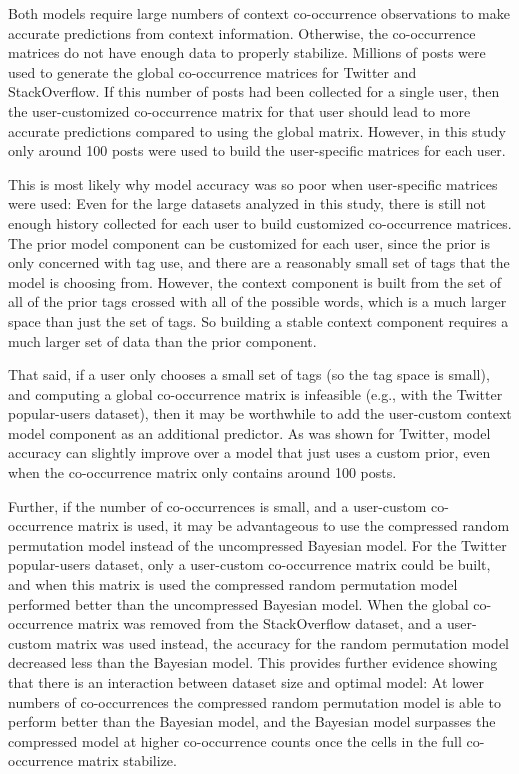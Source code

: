 \documentclass[man,floatsintext,donotrepeattitle]{apa6}
\begin{document}
Both models require large numbers of context co-occurrence observations to make accurate predictions from context information.
Otherwise, the co-occurrence matrices do not have enough data to properly stabilize.
Millions of posts were used to generate the global co-occurrence matrices for Twitter and StackOverflow.
If this number of posts had been collected for a single user, then the user-customized co-occurrence matrix for that user should lead to more accurate predictions compared to using the global matrix.
However, in this study only around 100 posts were used to build the user-specific matrices for each user.

This is most likely why model accuracy was so poor when user-specific matrices were used:
Even for the large datasets analyzed in this study, there is still not enough history collected for each user to build customized co-occurrence matrices.
The prior model component can be customized for each user, since the prior is only concerned with tag use, and there are a reasonably small set of tags that the model is choosing from.
However, the context component is built from the set of all of the prior tags crossed with all of the possible words, which is a much larger space than just the set of tags.
So building a stable context component requires a much larger set of data than the prior component.

That said, if a user only chooses a small set of tags (so the tag space is small), and computing a global co-occurrence matrix is infeasible (e.g., with the Twitter popular-users dataset), 
then it may be worthwhile to add the user-custom context model component as an additional predictor.
As was shown for Twitter, model accuracy can slightly improve over a model that just uses a custom prior, even when the co-occurrence matrix only contains around 100 posts.

Further, if the number of co-occurrences is small, and a user-custom co-occurrence matrix is used, it may be advantageous to use the compressed random permutation model instead of the uncompressed Bayesian model.
For the Twitter popular-users dataset, only a user-custom co-occurrence matrix could be built, and when this matrix is used the compressed random permutation model performed better than the uncompressed Bayesian model.
When the global co-occurrence matrix was removed from the StackOverflow dataset, and a user-custom matrix was used instead, the accuracy for the random permutation model decreased less than the Bayesian model. 
This provides further evidence showing that there is an interaction between dataset size and optimal model:
At lower numbers of co-occurrences the compressed random permutation model is able to perform better than the Bayesian model,
and the Bayesian model surpasses the compressed model at higher co-occurrence counts once the cells in the full co-occurrence matrix stabilize. 
\end{document}
